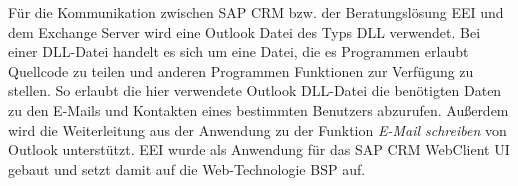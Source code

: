 Für die Kommunikation zwischen SAP \ac{CRM} bzw. der Beratungslösung \ac{EEI} und dem Exchange Server wird eine Outlook Datei des Typs \ac{DLL} verwendet. \cite[S. 12, 20]{Scharfenberger.2011}
Bei einer \ac{DLL}-Datei handelt es sich um eine Datei, die es Programmen erlaubt Quellcode zu teilen und anderen Programmen Funktionen zur Verfügung zu stellen. \cite{Microsoft.24.09.2011} So erlaubt die hier verwendete Outlook \ac{DLL}-Datei die benötigten Daten zu den E-Mails und Kontakten eines bestimmten Benutzers abzurufen. Außerdem wird die Weiterleitung aus der Anwendung zu der Funktion \emph{E-Mail schreiben} von Outlook unterstützt. \cite[S. 6-7]{SAPAG.2011}
\ac{EEI} wurde als Anwendung für das SAP \ac{CRM} WebClient \ac{UI} gebaut und setzt damit auf die Web-Technologie \ac{BSP} auf. \cite[S. 6]{SAPAG.2011}
